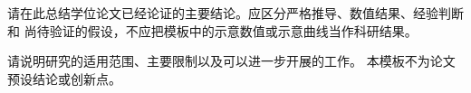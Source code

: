 \label{chap:conclusion}
请在此总结学位论文已经论证的主要结论。应区分严格推导、数值结果、经验判断和
尚待验证的假设，不应把模板中的示意数值或示意曲线当作科研结果。

请说明研究的适用范围、主要限制以及可以进一步开展的工作。
本模板不为论文预设结论或创新点。
